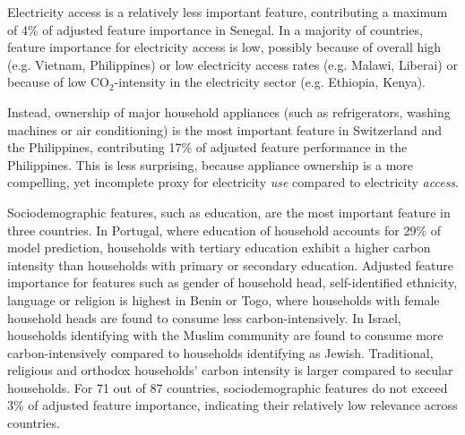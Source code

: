 \documentclass[12pt, a4paper]{article}
\begin{document}
Electricity access is a relatively less important feature, contributing a maximum of 4\% of adjusted feature importance in Senegal. In a majority of countries, feature importance for electricity access is low, possibly because of overall high (e.g. Vietnam, Philippines) or low electricity access rates (e.g. Malawi, Liberai) or because of low CO$_{2}$-intensity in the electricity sector (e.g. Ethiopia, Kenya).

Instead, ownership of major household appliances (such as refrigerators, washing machines or air conditioning) is the most important feature in Switzerland and the Philippines, contributing 17\% of adjusted feature performance in the Philippines. This is less surprising, because appliance ownership is a more compelling, yet incomplete proxy for electricity \textit{use} compared to electricity \textit{access}.

Sociodemographic features, such as education, are the most important feature in three countries. In Portugal, where education of household accounts for 29\% of model prediction, households with tertiary education exhibit a higher carbon intensity than households with primary or secondary education. Adjusted feature importance for features such as gender of household head, self-identified ethnicity, language or religion is highest in Benin or Togo, where households with female household heads are found to consume less carbon-intensively. In Israel, households identifying with the Muslim community are found to consume more carbon-intensively compared to households identifying as Jewish. Traditional, religious and orthodox households' carbon intensity is larger compared to secular households. For 71 out of 87 countries, sociodemographic features do not exceed 3\% of adjusted feature importance, indicating their relatively low relevance across countries.
\end{document}
